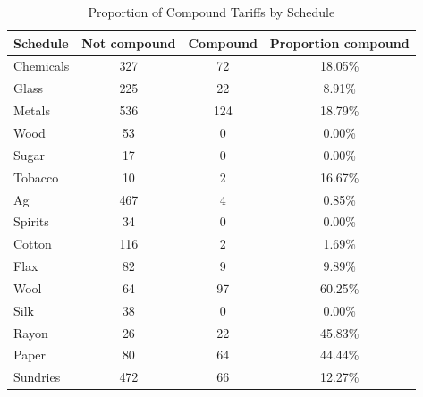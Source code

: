 \documentclass[
  12pt,
]{article}
\begin{document}
\begin{table}

\caption{\label{tab:comp-sc}Proportion of Compound Tariffs by Schedule }
\centering
\begin{tabular}[t]{lccc}
\toprule
Schedule & Not compound & Compound & Proportion compound\\
\midrule
Chemicals & 327 & 72 & 18.05\%\\
Glass & 225 & 22 & 8.91\%\\
Metals & 536 & 124 & 18.79\%\\
Wood & 53 & 0 & 0.00\%\\
Sugar & 17 & 0 & 0.00\%\\
\addlinespace
Tobacco & 10 & 2 & 16.67\%\\
Ag & 467 & 4 & 0.85\%\\
Spirits & 34 & 0 & 0.00\%\\
Cotton & 116 & 2 & 1.69\%\\
Flax & 82 & 9 & 9.89\%\\
\addlinespace
Wool & 64 & 97 & 60.25\%\\
Silk & 38 & 0 & 0.00\%\\
Rayon & 26 & 22 & 45.83\%\\
Paper & 80 & 64 & 44.44\%\\
Sundries & 472 & 66 & 12.27\%\\
\bottomrule
\end{tabular}
\end{table}
\end{document}
